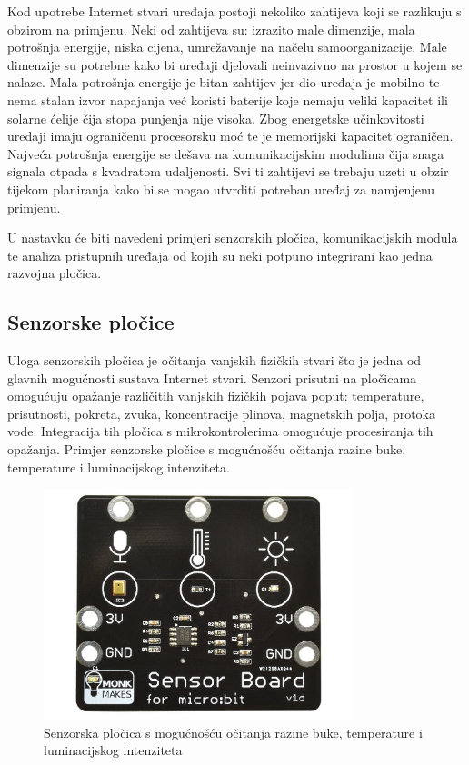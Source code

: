 \documentclass[times, utf8, diplomski]{fer}
\begin{document}
Kod upotrebe Internet stvari uređaja postoji nekoliko zahtijeva koji se razlikuju s obzirom na primjenu. Neki od zahtijeva su: izrazito male dimenzije, mala potrošnja energije, niska cijena, umrežavanje na načelu samoorganizacije. Male dimenzije su potrebne kako bi uređaji djelovali neinvazivno na prostor u kojem se nalaze. Mala potrošnja energije je bitan zahtijev jer dio uređaja je mobilno te nema stalan izvor napajanja već koristi baterije koje nemaju veliki kapacitet ili solarne ćelije čija stopa punjenja nije visoka. Zbog energetske učinkovitosti uređaji imaju ograničenu procesorsku moć te je memorijski kapacitet ograničen. Najveća potrošnja energije se dešava na komunikacijskim modulima čija snaga signala otpada s kvadratom udaljenosti. Svi ti zahtijevi se trebaju uzeti u obzir tijekom planiranja kako bi se mogao utvrditi potreban uređaj za namjenjenu primjenu.

U nastavku će biti navedeni primjeri senzorskih pločica, komunikacijskih modula te analiza pristupnih uređaja od kojih su neki potpuno integrirani kao jedna razvojna pločica.

\subsection{Senzorske pločice}
Uloga senzorskih pločica je očitanja vanjskih fizičkih stvari što je jedna od glavnih mogućnosti sustava Internet stvari. Senzori prisutni na pločicama omogućuju opažanje različitih vanjskih fizičkih pojava poput: temperature, prisutnosti, pokreta, zvuka, koncentracije plinova, magnetskih polja, protoka vode. Integracija tih pločica s mikrokontrolerima omogućuje procesiranja tih opažanja. Primjer senzorske pločice s mogućnošću očitanja razine buke, temperature i luminacijskog intenziteta.
\begin{figure}[htb]
    \centering
    \includegraphics[width=9cm]{images/sensor_board.jpg}
    \caption{Senzorska pločica s mogućnošću očitanja razine buke, temperature i luminacijskog intenziteta\citep{SensorBoard}}
    \label{fig:sensorboard}
\end{figure}
\end{document}
